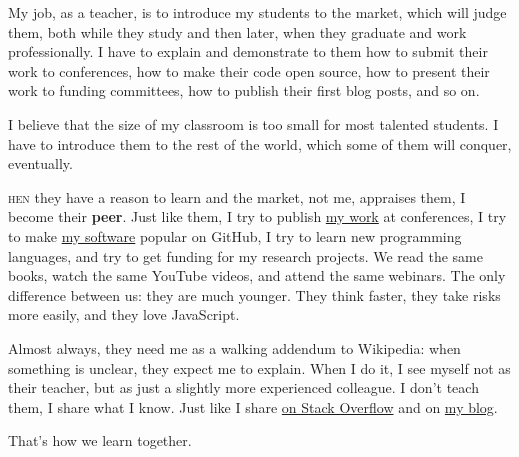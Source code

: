 \documentclass{./yb}
\newcommand\first[2]{\vspace{1em}{\setlength{\parindent}{0pt}\bfseries\LARGE #1}\textsc{#2}}
\begin{document}
My job, as a teacher, is to introduce my students to the market, which will
judge them, both while they study and then later, when they graduate and work
professionally. I have to explain and
demonstrate to them how to submit their work to conferences, how to make
their code open source, how to present their work to funding committees,
how to publish their first blog posts, and so on.

I believe that the size of my classroom is too small for most talented students.
I have to introduce them to the rest of the world, which some of them will conquer, eventually.

\first{W}{hen} they have a reason to learn and the market, not me, appraises
them, I become their \textbf{peer}. Just like them, I try to publish
\href{https://www.yegor256.com/papers.html}{my work} at conferences,
I try to make \href{https://github.com/yegor256}{my software}
popular on GitHub, I try to learn new programming
languages, and try to get funding for my research projects.
We read the same books, watch the same YouTube videos, and attend the same webinars.
The only difference between us: they are much younger. They
think faster, they take risks more easily, and they love JavaScript.

Almost always, they need me as a walking addendum to Wikipedia:
when something is unclear, they expect me to explain. When I do it,
I see myself not as their teacher, but as just a slightly more experienced colleague.
I don't teach them, I share what I know. Just like I share
\href{https://stackoverflow.com/users/187141/yegor256}{on Stack Overflow}
and on \href{https://www.yegor256.com}{my blog}.

That's how we learn together.
\end{document}
